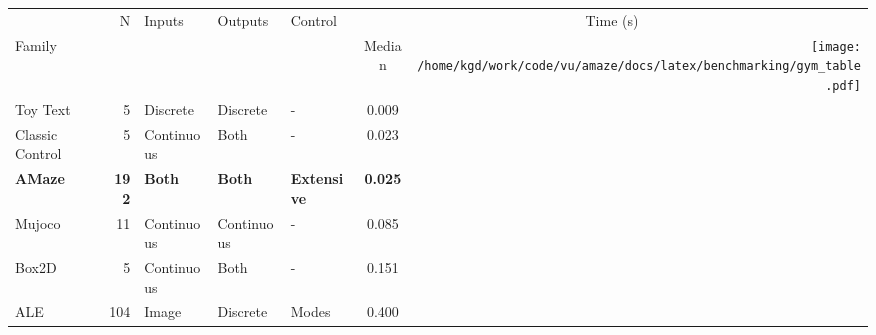 \documentclass{standalone}
\begin{document}
\newlength{\img}%
\setlength{\img}{7.2\baselineskip}%
\begin{tabular}{lrlllc@{ }r@{}}
\toprule
 &\multirow{2}{*}{ N }&\multirow{2}{*}{ Inputs }&\multirow{2}{*}{ Outputs }&\multirow{2}{*}{ Control }& \multicolumn{2}{c}{Time (s)} \\ 
\cmidrule(lr){6-7}
Family &  &  &  &  & Median & \multirow{7.77}{*}{\texttt{[image: /home/kgd/work/code/vu/amaze/docs/latex/benchmarking/gym\_table.pdf]}} \\
\cmidrule(r){1-6}
Toy Text & 5 & Discrete & Discrete & - & 0.009 \\
Classic Control & 5 & Continuous & Both & - & 0.023 \\
\textbf{AMaze} & \textbf{192} & \textbf{Both} & \textbf{Both} & \textbf{Extensive} & \textbf{0.025 }\\
Mujoco & 11 & Continuous & Continuous & - & 0.085 \\
Box2D & 5 & Continuous & Both & - & 0.151 \\
ALE & 104 & Image & Discrete & Modes & 0.400 \\
\bottomrule
\end{tabular}
\end{document}
